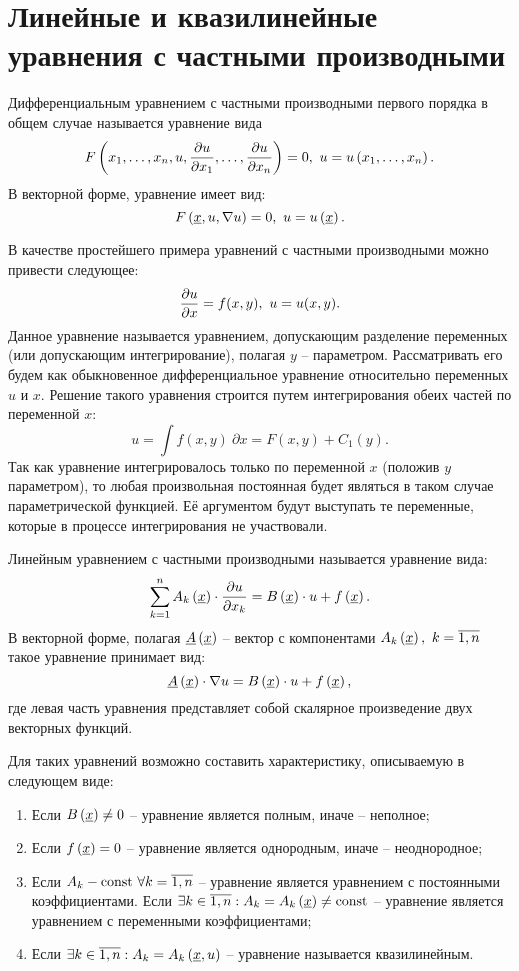 \section{Линейные и квазилинейные уравнения с частными производными}

	Дифференциальным уравнением с частными производными первого порядка в общем случае называется уравнение вида
	\[ F \left( x_1, \dots, x_n, u, \dfrac{\partial u}{\partial x_1}, \dots, \dfrac{\partial u}{\partial x_n} \right) = 0, ~ u = u\left( x_1, \dots, x_n \right). \]
	В векторной форме, уравнение имеет вид:
	\[ F \left( \underline{x}, u, \nabla{u} \right) = 0, ~ u = u\left( \underline{x} \right). \] 

	В качестве простейшего примера уравнений с частными производными можно привести следующее:
	\[ \dfrac{\partial u}{\partial x} = f(x, y), ~ u = u(x, y). \]
	Данное уравнение называется уравнением, допускающим разделение переменных (или допускающим интегрирование), полагая $y$ -- параметром. Рассматривать его будем как обыкновенное дифференциальное уравнение относительно переменных $u$ и $x$. Решение такого уравнения строится путем интегрирования обеих частей по переменной $x$:
	\[ u = \int f(x, y) ~ \partial x = F(x, y) + C_1(y). \]
	Так как уравнение интегрировалось только по переменной $x$ (положив $y$ параметром), то любая произвольная постоянная будет являться в таком случае параметрической функцией. Её аргументом будут выступать те переменные, которые в процессе интегрирования не участвовали.

	\vspace{15pt}

	Линейным уравнением с частными производными называется уравнение вида:
	\[ \sum_{k = 1}^{n} A_k \left( \underline{x} \right) \cdot \dfrac{\partial u}{\partial x_k} = B\left( \underline{x} \right) \cdot u + f\left( \underline{x} \right). \]
	В векторной форме, полагая $\underline{A} \left( \underline{x} \right)$ -- вектор с компонентами $A_k \left( \underline{x} \right), ~ k = \overline{1, n}$ такое уравнение принимает вид:
	\[ \underline{A}\left( \underline{x} \right) \cdot \nabla{u} = B \left( \underline{x} \right) \cdot u + f \left( \underline{x} \right), \]
	где левая часть уравнения представляет собой скалярное произведение двух векторных функций.

	\vspace{15pt}

	Для таких уравнений возможно составить характеристику, описываемую в следующем виде:
	\begin{enumerate}
		\item Если \( B\left( \underline{x} \right) \neq 0 \) -- уравнение является полным, иначе -- неполное;
		\item Если \( f\left( \underline{x} \right) = 0 \) -- уравнение является однородным, иначе -- неоднородное;
		\item Если \( A_k - \mathrm{const} ~ \forall k = \overline{1, n} \) -- уравнение является уравнением с постоянными коэффициентами. Если \( \exists k \in \overline{1, n} : A_k = A_k\left( \underline{x} \right) \neq \mathrm{const} \) -- уравнение является уравнением с переменными коэффициентами;
		\item Если \( \exists k \in \overline{1, n} : A_k = A_k \left( \underline{x}, u \right) \) -- уравнение называется квазилинейным.
	\end{enumerate}


